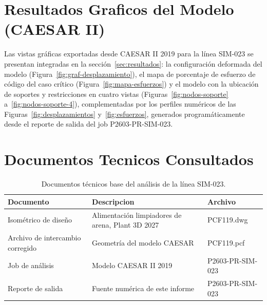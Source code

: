 \appendix
\section{Resultados Graficos del Modelo (CAESAR II)}
\label{appendix:graficos}

Las vistas gr\'{a}ficas exportadas desde CAESAR II 2019 para la l\'{i}nea
SIM-023 se presentan integradas en la secci\'{o}n~\ref{sec:resultados}: la
configuraci\'{o}n deformada del modelo (Figura~\ref{fig:graf-desplazamiento}),
el mapa de porcentaje de esfuerzo de c\'{o}digo del caso cr\'{i}tico
(Figura~\ref{fig:mapa-esfuerzos}) y el
modelo con la ubicaci\'{o}n de soportes y restricciones en cuatro vistas
(Figuras~\ref{fig:nodos-soporte} a~\ref{fig:nodos-soporte-4}), complementadas
por los perfiles num\'{e}ricos de las Figuras~\ref{fig:desplazamientos}
y~\ref{fig:esfuerzos}, generados program\'{a}ticamente desde el reporte de
salida del job P2603-PR-SIM-023.

\section{Documentos Tecnicos Consultados}
\label{appendix:documentos}

\begin{table}[htbp]
    \centering
    \small
    \caption{Documentos t\'{e}cnicos base del an\'{a}lisis de la l\'{i}nea SIM-023.}
    \label{tab:planos}
    \begin{tabular}{@{}lll@{}}
        \toprule
        \textbf{Documento} & \textbf{Descripcion} & \textbf{Archivo} \\
        \midrule
        Isom\'{e}trico de dise\~{n}o & Alimentaci\'{o}n limpiadores de arena, Plant 3D 2027 & PCF119.dwg \\
        Archivo de intercambio corregido & Geometr\'{i}a del modelo CAESAR & PCF119.pcf \\
        Job de an\'{a}lisis & Modelo CAESAR II 2019 & P2603-PR-SIM-023 \\
        Reporte de salida & Fuente num\'{e}rica de este informe & P2603-PR-SIM-023 \\
        \bottomrule
    \end{tabular}
\end{table}
